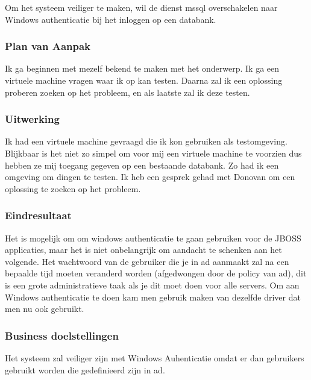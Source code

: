 Om het systeem veiliger te maken, wil de dienst \gls{mssql} overschakelen naar Windows authenticatie bij het inloggen op een databank.

\subsubsection{Plan van Aanpak}

Ik ga beginnen met mezelf bekend te maken met het onderwerp. Ik ga een virtuele machine vragen waar ik op kan testen. Daarna zal ik een oplossing proberen zoeken op het probleem, en als laatste zal ik deze testen.

\subsubsection{Uitwerking}

Ik had een virtuele machine gevraagd die ik kon gebruiken als testomgeving. Blijkbaar is het niet zo simpel om voor mij een virtuele machine te voorzien dus hebben ze mij toegang gegeven op een bestaande databank. Zo had ik een omgeving om dingen te testen. Ik heb een gesprek gehad met Donovan om een oplossing te zoeken op het probleem.

\subsubsection{Eindresultaat}

Het is mogelijk om om windows authenticatie te gaan gebruiken voor de JBOSS applicaties, maar het is niet onbelangrijk om aandacht te schenken aan het volgende. Het wachtwoord van de gebruiker die je in \gls{ad} aanmaakt zal na een bepaalde tijd moeten veranderd worden (afgedwongen door de policy van \gls{ad}), dit is een grote administratieve taak als je dit moet doen voor alle servers. Om aan Windows authenticatie te doen kam men gebruik maken van dezelfde driver dat men nu ook gebruikt.

\subsubsection{Business doelstellingen}

Het systeem zal veiliger zijn met Windows Auhenticatie omdat er dan gebruikers gebruikt worden die gedefinieerd zijn in \gls{ad}.
\pagebreak